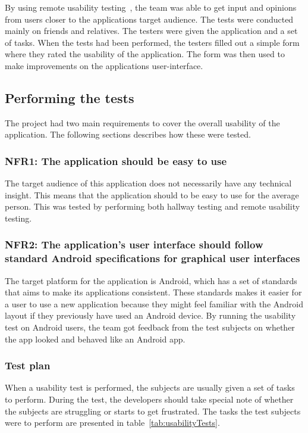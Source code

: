 
By using remote usability testing~\cite{remoteTest}, the team was able to get input and opinions from users closer to the applications target audience.
The tests were conducted mainly on friends and relatives. The testers were given the application and a set of tasks. When the tests had been performed, the testers filled out a simple form where they rated the usability of the application. The form was then used to make improvements on the applications user-interface.

\subsection{Performing the tests}
The project had two main requirements to cover the overall usability of the application. The following sections describes how these were tested.


\subsubsection{NFR1: The application should be easy to use}
The target audience of this application does not necessarily have any technical insight. This means that the application should to be easy to use for the average person. This was tested by performing both hallway testing and remote usability testing.

\subsubsection{NFR2: The application's user interface should follow standard Android specifications for graphical user interfaces}
The target platform for the application is Android, which has a set of standards that aims to make its applications consistent. These standards makes it easier for a user to use a new application because they might feel familiar with the Android layout if they previously have used an Android device.
By running the usability test on Android users, the team got feedback from the test subjects on whether the app looked and behaved like an Android app.

\subsubsection{Test plan}
When a usability test is performed, the subjects are usually given a set of tasks to perform. During the test, the developers should take special note of whether the subjects are struggling or starts to get frustrated. The tasks the test subjects were to perform are presented in table~\ref{tab:usabilityTests}. 

